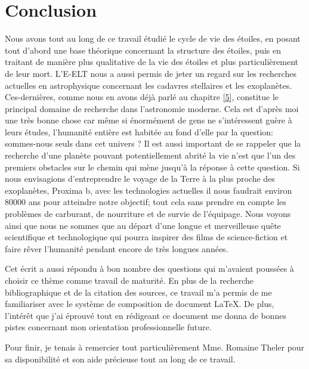 

\chapter*{Conclusion}


\vfill

Nous avons tout au long de ce travail étudié le cycle de vie des étoiles, en posant tout d'abord une base théorique concernant la structure des étoiles, puis en traitant de manière plus qualitative de la vie des étoiles et plus particulièrement de leur mort. L'E-ELT nous a aussi permis de jeter un regard sur les recherches actuelles en astrophysique concernant les cadavres stellaires et les exoplanètes. Ces-dernières, comme nous en avons déjà parlé au chapitre \ref{5}, constitue le principal domaine de recherche dans l'astronomie moderne. Cela est d'après moi une très bonne chose car même si énormément de gens ne s'intéressent guère à leurs études, l'humanité entière est habitée au fond d'elle par la question: sommes-nous seuls dans cet univers ? Il est aussi important de se rappeler que la recherche d'une planète pouvant potentiellement abrité la vie n'est que l'un des premiers obstacles sur le chemin qui mène jusqu'à la réponse à cette question. Si nous envisagions d'entreprendre le voyage de la Terre à la plus proche des exoplanètes, Proxima b, avec les technologies actuelles il nous faudrait environ 80000 ans pour atteindre notre objectif; tout cela sans prendre en compte les problèmes de carburant, de nourriture et de survie de l'équipage. Nous voyons ainsi que nous ne sommes que au départ d'une longue et merveilleuse quête scientifique et technologique qui pourra inspirer des films de science-fiction et faire rêver l'humanité pendant encore de très longues années.\smallskip

Cet écrit a aussi répondu à bon nombre des questions qui m'avaient poussées à choisir ce thème comme travail de maturité. En plus de la recherche bibliographique et de la citation des sources, ce travail m'a permis de me familiariser avec le système de composition de document \LaTeX. De plus, l'intérêt que j'ai éprouvé tout en rédigeant ce document me donna de bonnes pistes concernant mon orientation professionnelle future.\bigskip

Pour finir, je tenais à remercier tout particulièrement Mme. Romaine Theler pour sa disponibilité et son aide précieuse tout au long de ce travail.





\vfill